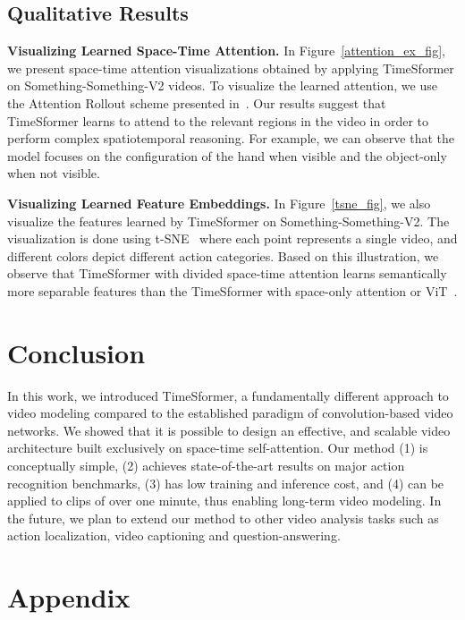 \documentclass{article}
\begin{document}
\subsection{Qualitative Results}

\textbf{Visualizing Learned Space-Time Attention.} In Figure~\ref{attention_ex_fig}, we present space-time attention visualizations obtained by applying TimeSformer on Something-Something-V2 videos. To visualize the learned attention, we use the Attention Rollout scheme presented in~\cite{abnar2020quantifying}.  Our results suggest that TimeSformer learns to attend to the relevant regions in the video in order to perform complex spatiotemporal reasoning. For example, we can observe that the model focuses on the configuration of the hand when visible and the object-only when not visible. 



\textbf{Visualizing Learned Feature Embeddings.} In Figure~\ref{tsne_fig}, we also visualize the features learned by TimeSformer on Something-Something-V2. The visualization is done using t-SNE~\cite{vanDerMaaten2008} where each point represents a single video, and different colors depict different action categories. Based on this illustration, we observe that TimeSformer with divided space-time attention learns semantically more separable features than the TimeSformer with space-only attention or ViT~\cite{Dosovitskiy:ICLR2021}.


\section{Conclusion}


In this work, we introduced TimeSformer, a fundamentally different approach to video modeling compared to the established paradigm of convolution-based video networks. We showed that it is possible to design an effective, and scalable video architecture built exclusively on space-time self-attention.  Our method (1) is conceptually simple, (2) achieves state-of-the-art results on major action recognition benchmarks, (3) has low training and inference cost, and (4) can be applied to clips of over one minute, thus enabling long-term video modeling. In the future, we plan to extend our method to other video analysis tasks such as action localization, video captioning and question-answering.



 



\appendix
\section*{Appendix}
\end{document}
